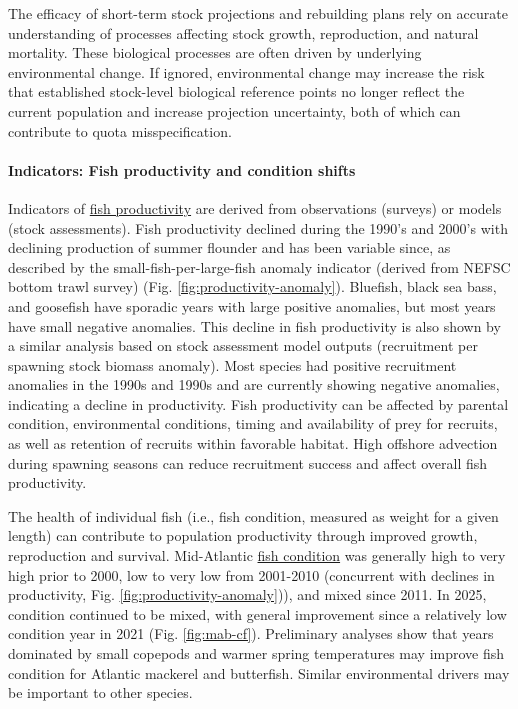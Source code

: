 \documentclass[
  10pt,
]{article}
\begin{document}
The efficacy of short-term stock projections and rebuilding plans rely
on accurate understanding of processes affecting stock growth,
reproduction, and natural mortality. These biological processes are
often driven by underlying environmental change. If ignored,
environmental change may increase the risk that established stock-level
biological reference points no longer reflect the current population and
increase projection uncertainty, both of which can contribute to quota
misspecification.

\paragraph{Indicators: Fish productivity and condition
shifts}\label{indicators-fish-productivity-and-condition-shifts}

Indicators of
\href{https://noaa-edab.github.io/catalog/productivity_anomaly.html}{fish
productivity} are derived from observations (surveys) or models (stock
assessments). Fish productivity declined during the 1990's and 2000's
with declining production of summer flounder and has been variable
since, as described by the small-fish-per-large-fish anomaly indicator
(derived from NEFSC bottom trawl survey) (Fig.
\ref{fig:productivity-anomaly}). Bluefish, black sea bass, and goosefish
have sporadic years with large positive anomalies, but most years have
small negative anomalies. This decline in fish productivity is also
shown by a similar analysis based on stock assessment model outputs
(recruitment per spawning stock biomass anomaly). Most species had
positive recruitment anomalies in the 1990s and 1990s and are currently
showing negative anomalies, indicating a decline in productivity. Fish
productivity can be affected by parental condition, environmental
conditions, timing and availability of prey for recruits, as well as
retention of recruits within favorable habitat. High offshore advection
during spawning seasons can reduce recruitment success and affect
overall fish productivity.

The health of individual fish (i.e., fish condition, measured as weight
for a given length) can contribute to population productivity through
improved growth, reproduction and survival. Mid-Atlantic
\href{https://noaa-edab.github.io/catalog/condition.html}{fish
condition} was generally high to very high prior to 2000, low to very
low from 2001-2010 (concurrent with declines in productivity, Fig.
\ref{fig:productivity-anomaly})), and mixed since 2011. In 2025,
condition continued to be mixed, with general improvement since a
relatively low condition year in 2021 (Fig. \ref{fig:mab-cf}).
Preliminary analyses show that years dominated by small copepods and
warmer spring temperatures may improve fish condition for Atlantic
mackerel and butterfish. Similar environmental drivers may be important
to other species.
\end{document}
